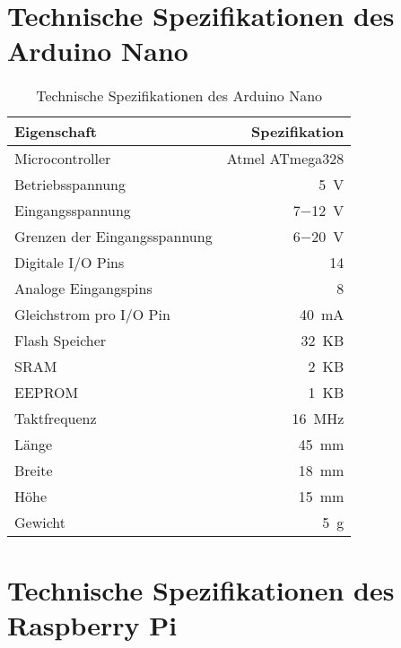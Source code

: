 \clearpage{}

\section{Technische Spezifikationen des Arduino\textsuperscript{\texttrademark} Nano}
\label{app:arduino}

\begin{table}[ht]
\begin{center}
\setlength{\tabcolsep}{20pt}
\begin{tabular}{lr}
\toprule
Eigenschaft & Spezifikation \\
\midrule
Microcontroller & Atmel ATmega328\\ \addlinespace
Betriebsspannung & \SI{5}{\volt}\\ \addlinespace
Eingangsspannung & \SI{7}{}$-$\SI{12}{\volt}\\ \addlinespace
Grenzen der Eingangsspannung & \SI{6}{}$-$\SI{20}{\volt}\\ \addlinespace
Digitale I/O Pins & \SI{14}{}\\ \addlinespace
Analoge Eingangspins & \SI{8}{}\\ \addlinespace
Gleichstrom pro I/O Pin & \SI{40}{\milli\ampere}\\ \addlinespace
Flash Speicher & \SI{32}{KB}\\ \addlinespace
SRAM & \SI{2}{KB} \\ \addlinespace
EEPROM & \SI{1}{KB}\\ \addlinespace
Taktfrequenz & \SI{16}{\mega\Hz}\\ \addlinespace
Länge & \SI{45}{\milli\meter}\\ \addlinespace
Breite & \SI{18}{\milli\meter}\\ \addlinespace
Höhe & \SI{15}{\milli\meter}\\ \addlinespace
Gewicht & \SI{5}{\gram}\\
\bottomrule
\end{tabular}
\caption{Technische Spezifikationen des Arduino\textsuperscript{\texttrademark} Nano}
\end{center}
\label{tab:arduino}
\end{table}

\clearpage{}

\section{Technische Spezifikationen des Raspberry Pi\textsuperscript{\texttrademark}}
\label{app:raspberry}

